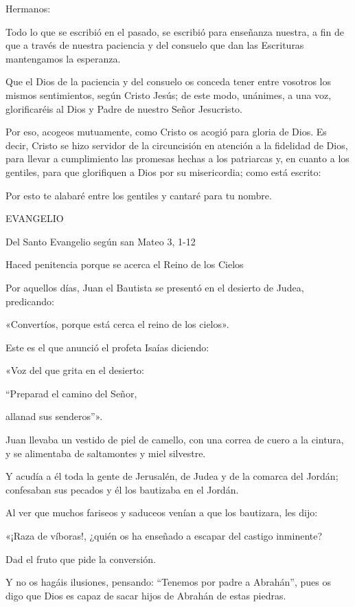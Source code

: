\documentclass[]{article}
\begin{document}
Hermanos:

Todo lo que se escribió en el pasado, se escribió para enseñanza
nuestra, a fin de que a través de nuestra paciencia y del consuelo que
dan las Escrituras mantengamos la esperanza.

Que el Dios de la paciencia y del consuelo os conceda tener entre
vosotros los mismos sentimientos, según Cristo Jesús; de este modo,
unánimes, a una voz, glorificaréis al Dios y Padre de nuestro Señor
Jesucristo.

Por eso, acogeos mutuamente, como Cristo os acogió para gloria de Dios.
Es decir, Cristo se hizo servidor de la circuncisión en atención a la
fidelidad de Dios, para llevar a cumplimiento las promesas hechas a los
patriarcas y, en cuanto a los gentiles, para que glorifiquen a Dios por
su misericordia; como está escrito:

Por esto te alabaré entre los gentiles y cantaré para tu nombre.

EVANGELIO

Del Santo Evangelio según san Mateo 3, 1-12

Haced penitencia porque se acerca el Reino de los Cielos

Por aquellos días, Juan el Bautista se presentó en el desierto de Judea,
predicando:

«Convertíos, porque está cerca el reino de los cielos».

Este es el que anunció el profeta Isaías diciendo:

«Voz del que grita en el desierto:

``Preparad el camino del Señor,

allanad sus senderos''».

Juan llevaba un vestido de piel de camello, con una correa de cuero a la
cintura, y se alimentaba de saltamontes y miel silvestre.

Y acudía a él toda la gente de Jerusalén, de Judea y de la comarca del
Jordán; confesaban sus pecados y él los bautizaba en el Jordán.

Al ver que muchos fariseos y saduceos venían a que los bautizara, les
dijo:

«¡Raza de víboras!, ¿quién os ha enseñado a escapar del castigo
inminente?

Dad el fruto que pide la conversión.

Y no os hagáis ilusiones, pensando: ``Tenemos por padre a Abrahán'',
pues os digo que Dios es capaz de sacar hijos de Abrahán de estas
piedras.
\end{document}
